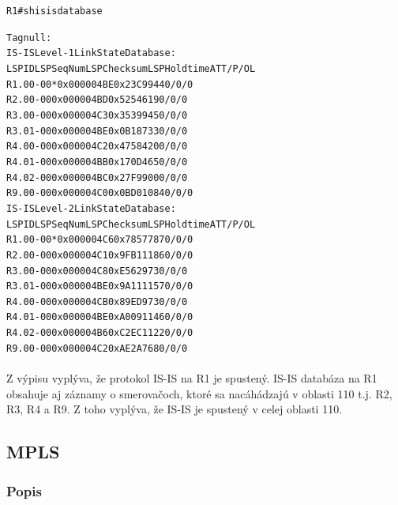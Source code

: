 \documentclass[12pt,twoside,a4paper]{report}
\begin{document}
\noindent
{\selectfont
\begin{small}
\begin{alltt}
R1#sh isis database 

Tag null:
IS-IS Level-1 Link State Database:
LSPID                 LSP Seq Num  LSP Checksum  LSP Holdtime      ATT/P/OL
R1.00-00            * 0x000004BE   0x23C9        944               0/0/0
R2.00-00              0x000004BD   0x5254        619               0/0/0
R3.00-00              0x000004C3   0x3539        945               0/0/0
R3.01-00              0x000004BE   0x0B18        733               0/0/0
R4.00-00              0x000004C2   0x4758        420               0/0/0
R4.01-00              0x000004BB   0x170D        465               0/0/0
R4.02-00              0x000004BC   0x27F9        900               0/0/0
R9.00-00              0x000004C0   0x0BD0        1084              0/0/0
IS-IS Level-2 Link State Database:
LSPID                 LSP Seq Num  LSP Checksum  LSP Holdtime      ATT/P/OL
R1.00-00            * 0x000004C6   0x7857        787               0/0/0
R2.00-00              0x000004C1   0x9FB1        1186              0/0/0
R3.00-00              0x000004C8   0xE562        973               0/0/0
R3.01-00              0x000004BE   0x9A11        1157              0/0/0
R4.00-00              0x000004CB   0x89ED        973               0/0/0
R4.01-00              0x000004BE   0xA009        1146              0/0/0
R4.02-00              0x000004B6   0xC2EC        1122              0/0/0
R9.00-00              0x000004C2   0xAE2A        768               0/0/0
\end{alltt}
\end{small}
}


\paragraph{}
Z výpisu vyplýva, že protokol IS-IS na R1 je spustený. IS-IS databáza na R1 obsahuje aj záznamy o smerovačoch, ktoré sa nacáhádzajú v oblasti 110 t.j. R2, R3, R4 a R9. Z toho vyplýva, že IS-IS je spustený v celej oblasti 110.











\subsection{MPLS}
\subsubsection{Popis}
\end{document}

